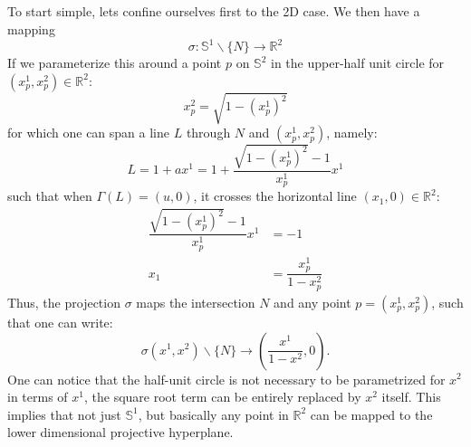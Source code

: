 \subsection{}
To start simple, lets confine ourselves first to the 2D case. We then have a mapping
\[
\sigma : \mathbb{S}^1 \backslash \{N\} \rightarrow \mathbb{R}^2 
\]
If we parameterize this around a point $p$ on $\mathbb{S}^2$ in the upper-half unit circle for $(x_p^1,x_p^2)\in \mathbb{R}^2$:
\[
x_p^2 = \sqrt{1-(x_p^1)^2}
\]
for which one can span a line $L$ through $N$ and $(x_p^1,x_p^2)$, namely:
\[
	L = 1 + ax^1 = 1 + \dfrac{\sqrt{1-(x_p^1)^2}-1}{x_p^1}x^1
\]
such that when $\Gamma(L)=(u, 0)$, it crosses the horizontal line $(x_1, 0) \in \mathbb{R}^2$:
\[
\begin{split}
	\dfrac{\sqrt{1-(x_p^1)^2}-1}{x_p^1}x^1 &= -1 \\
	x_1 &= \dfrac{x_p^1}{1-x_p^2}
\end{split}
\]
Thus, the projection $\sigma$ maps the intersection $N$ and any point $p = (x_p^1, x_p^2)$, such that one can write: 
\[
\sigma(x^1, x^2) \backslash \{N\} \rightarrow \left(\dfrac{x^1}{1-x^2}, 0\right).
\]
One can notice that the half-unit circle is not necessary to be parametrized for $x^2$ in terms of $x^1$, the square root term can be entirely replaced by $x^2$ itself. This  implies that not just $\mathbb{S}^1$, but basically any point in $\mathbb{R}^2$ can be mapped to the lower dimensional projective hyperplane.